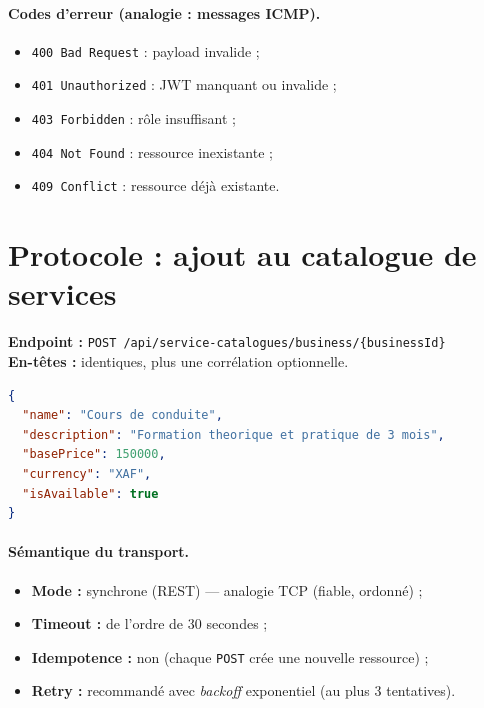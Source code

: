 \paragraph{Codes d'erreur (analogie : messages ICMP).}
\begin{itemize}
  \item \texttt{400 Bad Request} : payload invalide ;
  \item \texttt{401 Unauthorized} : JWT manquant ou invalide ;
  \item \texttt{403 Forbidden} : rôle insuffisant ;
  \item \texttt{404 Not Found} : ressource inexistante ;
  \item \texttt{409 Conflict} : ressource déjà existante.
\end{itemize}

\section{Protocole : ajout au catalogue de services}

\noindent\textbf{Endpoint :} \texttt{POST /api/service-catalogues/business/\{businessId\}}\\
\textbf{En-têtes :} identiques, plus une corrélation optionnelle.

\begin{lstlisting}[language=json,caption={Corps de la requête},captionpos=b]
{
  "name": "Cours de conduite",
  "description": "Formation theorique et pratique de 3 mois",
  "basePrice": 150000,
  "currency": "XAF",
  "isAvailable": true
}
\end{lstlisting}

\paragraph{Sémantique du transport.}
\begin{itemize}
  \item \textbf{Mode :} synchrone (REST) --- analogie TCP (fiable, ordonné) ;
  \item \textbf{Timeout :} de l'ordre de 30 secondes ;
  \item \textbf{Idempotence :} non (chaque \texttt{POST} crée une nouvelle ressource) ;
  \item \textbf{Retry :} recommandé avec \emph{backoff} exponentiel (au plus 3 tentatives).
\end{itemize}


